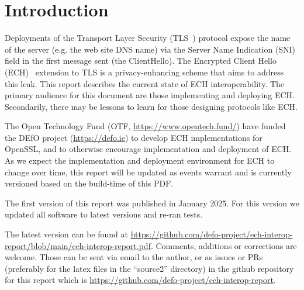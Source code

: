 \section{Introduction}

Deployments of the Transport Layer Security (TLS~\cite{rfc8446}) protocol
expose the name of the server (e.g. the web site DNS name) via the Server Name
Indication (SNI) field in the first message sent (the ClientHello).  The
Encrypted Client Hello (ECH)~\cite{draft-ietf-tls-esni} extension to TLS is a
privacy-enhancing scheme that aims to address this leak.
This report describes the current state of ECH interoperability.
The primary audience for this document are those implementing and
deploying ECH. Secondarily, there may be lessons to learn for those
designing protocols like ECH.

The Open Technology Fund (OTF, \url{https://www.opentech.fund/}) have
funded the DEfO project (\url{https://defo.ie}) to develop
ECH implementations for OpenSSL, and to otherwise encourage implementation
and deployment of ECH.
As we expect the implementation and deployment environment for ECH to change
over time, this report will be updated as events warrant and is currently
versioned based on the build-time of this PDF.

The first version of this report was published in January 2025. \cite{echinterop1}
For this version we updated all software to latest versions and re-ran tests.

The latest version can be found at
\url{https://github.com/defo-project/ech-interop-report/blob/main/ech-interop-report.pdf}.
Comments, additions or corrections are welcome. Those can be sent via email to
the author, or as issues or PRs (preferably for the latex files in the
``source2'' directory) in the github repository for this report which is
\url{https://github.com/defo-project/ech-interop-report}.
